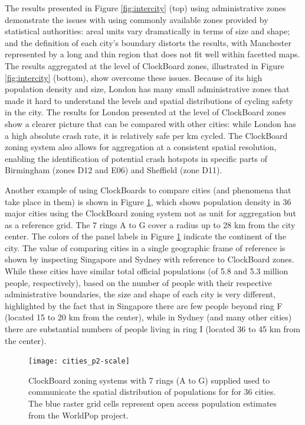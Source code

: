 \documentclass{josis}
\begin{document}
The results presented in Figure \ref{fig:intercity} (top) using administrative zones demonstrate the issues with using commonly available zones provided by statistical authorities: areal units vary dramatically in terms of size and shape; and the definition of each city's boundary distorts the results, with Manchester represented by a long and thin region that does not fit well within facetted maps.
The results aggregated at the level of ClockBoard zones, illustrated in Figure \ref{fig:intercity} (bottom), show overcome these issues.
Because of its high population density and size, London has many small administrative zones that made it hard to understand the levels and spatial distributions of cycling safety in the city.
The results for London presented at the level of ClockBoard zones show a clearer picture that can be compared with other cities: while London has a high absolute crash rate, it is relatively safe per km cycled.
The ClockBoard zoning system also allows for aggregation at a consistent spatial resolution, enabling the identification of potential crash hotspots in specific parts of Birmingham (zones D12 and E06) and Sheffield (zone D11).

Another example of using ClockBoards to compare cities (and phenomena that take place in them) is shown in Figure \ref{fig:popdens}, which shows population density in 36 major cities using the ClockBoard zoning system not as unit for aggregation but as a reference grid.
The 7 rings A to G cover a radius up to 28 km from the city center.
The colors of the panel labels in Figure \ref{fig:popdens} indicate the continent of the city.
The value of comparing cities in a single geographic frame of reference is shown by inspecting Singapore and Sydney with reference to ClockBoard zones.
While these cities have similar total official populations (of 5.8 and 5.3 million people, respectively), based on the number of people with their respective administrative boundaries, the size and shape of each city is very different, highlighted by the fact that in Singapore there are few people beyond ring F (located 15 to 20 km from the center), while in Sydney (and many other cities) there are substantial numbers of people living in ring I (located 36 to 45 km from the center).

\begin{figure}

{\centering \texttt{[image: cities\_p2-scale]} 

}

\caption{ClockBoard zoning systems with 7 rings (A to G) supplied used to communicate the spatial distribution of populations for for 36 cities. The blue raster grid cells represent open access population estimates from the WorldPop project.}\label{fig:popdens}
\end{figure}
\end{document}
